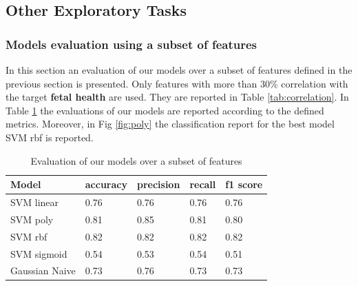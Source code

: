 \documentclass[a4paper,12pt]{article}
\begin{document}
\subsection{Other Exploratory Tasks}

\subsubsection{Models evaluation using a subset of features}

In this section an evaluation of our models over a subset of features defined in the previous section is presented. Only features with more than 30\% correlation with the target \textbf{fetal health} are used. They are reported in Table \ref{tab:correlation}. In Table \ref{tab:subset} the evaluations of our models are reported according to the defined metrics. Moreover, in Fig \ref{fig:poly} the classification report for the best model SVM rbf is reported.

\begin{table}[H]
\begin{tabular}{ |p{6cm}||p{2cm}|p{2cm}|p{2cm}|p{2cm}| }
  \hline
  Model& accuracy & precision  &  recall & f1 score \\
  \hline
  SVM linear &          0.76&   0.76&  0.76&  0.76\\
  SVM poly   &          0.81&   0.85&  0.81&  0.80\\
  SVM rbf    &          0.82&   0.82&  0.82&  0.82\\
  SVM sigmoid &         0.54&   0.53&  0.54&  0.51\\
  Gaussian Naive &         0.73&   0.76&  0.73&  0.73\\
  \hline
\end{tabular}
\caption{Evaluation of our models over a subset of features}
\label{tab:subset}
\end{table}
\end{document}
